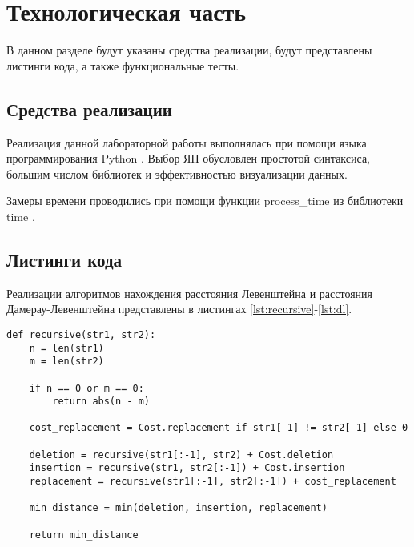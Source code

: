\chapter{Технологическая часть}

В данном разделе будут указаны средства реализации, будут представлены листинги кода, а также функциональные тесты.

\section{Средства реализации}

Реализация данной лабораторной работы выполнялась при помощи языка программирования Python \cite{python}. Выбор ЯП обусловлен простотой синтаксиса, большим числом библиотек и эффективностью визуализации данных.

Замеры времени проводились при помощи функции process\_time из библиотеки time \cite{python-time}.

\section{Листинги кода}

Реализации алгоритмов нахождения расстояния Левенштейна и расстояния Дамерау-Левенштейна представлены в листингах \ref{lst:recursive}-\ref{lst:dl}.
\clearpage
\begin{center}
\captionsetup{justification=raggedright,singlelinecheck=off}
\begin{lstlisting}[label=lst:recursive,caption=Рекурсивный алгоритм нахождения расстояния Левенштейна]
def recursive(str1, str2):
    n = len(str1)
    m = len(str2)

    if n == 0 or m == 0:
        return abs(n - m)

    cost_replacement = Cost.replacement if str1[-1] != str2[-1] else 0

    deletion = recursive(str1[:-1], str2) + Cost.deletion
    insertion = recursive(str1, str2[:-1]) + Cost.insertion
    replacement = recursive(str1[:-1], str2[:-1]) + cost_replacement

    min_distance = min(deletion, insertion, replacement)

    return min_distance
\end{lstlisting} 
\end{center}

